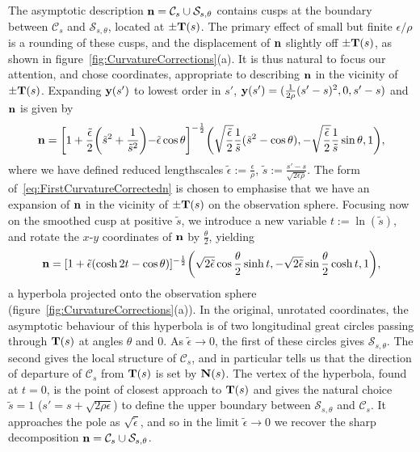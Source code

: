     The asymptotic description ${\bf n} = \mathcal{C}_s \cup \mathcal{S}_{s,\theta}$ contains cusps at the boundary between $\mathcal{C}_s$ and $\mathcal{S}_{s,\theta}$, located at $\pm {\bf T}(s)$. The primary effect of small but finite $\epsilon/\rho$ is a rounding of these cusps, and the displacement of ${\bf n}$ slightly off $\pm {\bf T}(s)$, as shown in figure~\ref{fig:CurvatureCorrections}(a). It is thus natural to focus our attention, and chose coordinates, appropriate to describing $\bf n$ in the vicinity of $\pm {\bf T}(s)$. Expanding ${\bf y}(s')$ to lowest order in $s'$, ${\bf y}(s') = (\frac{1}{2\rho}(s'-s)^2,0,s'-s)$ and $\bf n$ is given by
    \begin{equation}
        {\bf n} = \biggl[1 + \frac{\tilde{\epsilon}}{2} \biggr(\tilde{s}^2 +\frac{1}{\tilde{s}^2}\biggl)- \tilde{\epsilon}\cos \theta \biggr]^{-\frac{1}{2}} 
        \biggr(
        \sqrt{\frac{\tilde{\epsilon}}{2}}\frac{1}{\tilde{s}} (\tilde{s}^2 - \cos \theta),
        -\sqrt{\frac{\tilde{\epsilon}}{2}}\frac{1}{\tilde{s}} \sin \theta,
        1
        \biggl),
        \label{eq:FirstCurvatureCorrectedn}
    \end{equation}
    where we have defined reduced lengthscales $\tilde{\epsilon}:=\frac{\epsilon}{\rho}$, $\tilde{s} :=\frac{s'-s}{\sqrt{2\epsilon \rho}}$. The form of~\eqref{eq:FirstCurvatureCorrectedn} is chosen to emphasise that we have an expansion of $\bf n$ in the vicinity of $\pm{\bf T}(s)$ on the observation sphere. Focusing now on the smoothed cusp at positive $\tilde{s}$, we introduce a new variable $t :=\ln(\tilde{s})$, and rotate the $x$-$y$ coordinates of ${\bf n}$ by $\frac{\theta}{2}$, yielding 
    \begin{equation}
        {\bf n}
        = [1 + \tilde{\epsilon}(\cosh 2t - \cos \theta )]^{-\frac{1}{2}}
        \biggr(
        \sqrt{2\tilde{\epsilon}} \cos \frac{\theta}{2} \sinh t, 
        -\sqrt{2\tilde{\epsilon}}\sin \frac{\theta}{2} \cosh t,
        1
        \biggl),
        \label{eq:CurvatureCorrectedn}
    \end{equation}
    a hyperbola projected onto the observation sphere (figure~\ref{fig:CurvatureCorrections}(a)). In the original, unrotated coordinates, the asymptotic behaviour of this hyperbola is of two longitudinal great circles passing through ${\bf T}(s)$ at angles $\theta$ and $0$. As $\tilde{\epsilon}\rightarrow 0$, the first of these circles gives $\mathcal{S}_{s,\theta}$. The second gives the local structure of $\mathcal{C}_s $, and in particular tells us that the direction of departure of $\mathcal{C}_s$ from ${\bf T}(s)$ is set by ${\bf N}(s)$. The vertex of the hyperbola, found at $t = 0$, is the point of closest approach to ${\bf T}(s)$ and gives the natural choice $\tilde{s} =1$ ($s' = s + \sqrt{2\rho \epsilon}$) to define the upper boundary between $\mathcal{S}_{s,\theta}$ and $\mathcal{C}_s $. It approaches the pole as $\sqrt{{\tilde{\epsilon}}}$, and so in the limit $\tilde{\epsilon} \rightarrow 0$ we recover the sharp decomposition ${\bf n} = \mathcal{C}_s \cup \mathcal{S}_{s,\theta}$.


